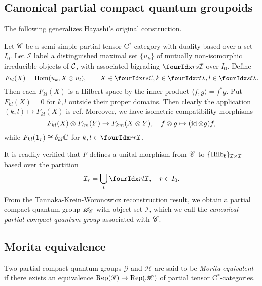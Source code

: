 
\subsection{Canonical partial compact quantum groupoids}

The following generalizes Hayashi's original construction.

\begin{Exa} 
Let $\mathscr{C}$ be a semi-simple partial tensor C$^*$-category with duality based over a set $I_0$. Let $\mathcal{I}$ label a distinguished maximal set $\{u_k\}$ of mutually non-isomorphic irreducible objects of $\mathcal{C}$, with associated bigrading $\Gru{\mathcal{I}}{r}{s}$ over $I_0$. Define \[F_{kl}(X)  = \Hom(u_k,  X\otimes u_l),\qquad X\in \Gru{\CatC}{r}{s}, k\in \Gru{\mathcal{I}}{r}{t},l\in \Gru{\mathcal{I}}{s}{t}.\] Then each $F_{kl}(X)$ is a Hilbert space by the inner product $\langle f,g\rangle = f^*g$. Put $F_{kl}(X) = 0$ for $k,l$ outside their proper domains. Then clearly the application $(k,l)\mapsto F_{kl}(X)$ is rcf. Moreover, we have isometric compatibility morphisms \[F_{kl}(X)\otimes F_{lm}(Y)\rightarrow F_{km}(X\otimes Y),\quad f\otimes g \mapsto (\operatorname{id}\otimes g)f,\] while $F_{kl}(\mathbf{1}_r) \cong \delta_{kl} \mathbb{C}$ for $k,l\in \Gru{\mathcal{I}}{r}{r}$. 

It is readily verified that $F$ defines a unital morphism from $\mathscr{C}$ to $\{\mathrm{Hilb}_{\operatorname{\mathrm{f}}}\}_{\mathcal{I}\times \mathcal{I}}$ based over the partition \[\mathcal{I}_r = \bigcup_{t} \Gru{\mathcal{I}}{r}{t},\quad r\in I_0.\] From the Tannaka-Krein-Woronowicz reconstruction result, we obtain a partial compact quantum group $\mathscr{A}_{\mathscr{C}}$ with object set $\mathcal{I}$, which we call the \emph{canonical partial compact quantum group} associated with $\mathscr{C}$. 
\end{Exa} 



\subsection{Morita equivalence}


\begin{Def} Two partial compact quantum groups $\mathscr{G}$ and $\mathscr{H}$ are said to be \emph{Morita equivalent} if there exists an equivalence $\mathrm{Rep}(\mathscr{G}) \rightarrow \mathrm{Rep}(\mathscr{H})$ of partial tensor C$^*$-categories. %
\end{Def} 

